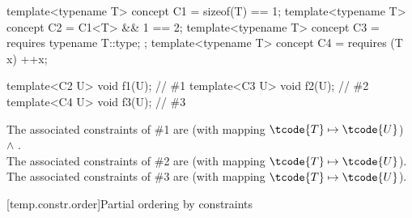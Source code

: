 \pnum
\begin{example}
\begin{codeblock}
template<typename T> concept C1 = sizeof(T) == 1;
template<typename T> concept C2 = C1<T> && 1 == 2;
template<typename T> concept C3 = requires { typename T::type; };
template<typename T> concept C4 = requires (T x) { ++x; }

template<C2 U> void f1(U);      // \#1
template<C3 U> void f2(U);      // \#2
template<C4 U> void f3(U);      // \#3
\end{codeblock}
The associated constraints of \#1 are
 (with mapping $\tcode{T} \mapsto \tcode{U}$) $\land$ .\\
The associated constraints of \#2 are
 (with mapping $\tcode{T} \mapsto \tcode{U}$).\\
The associated constraints of \#3 are
 (with mapping $\tcode{T} \mapsto \tcode{U}$).
\end{example}

[temp.constr.order]{Partial ordering by constraints}

